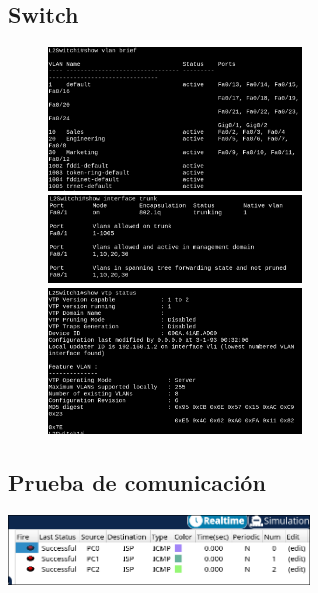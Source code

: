 \documentclass[letterpaper,12pt]{article}
\begin{document}
\begin{sloppypar}
\subsection{Switch}
\begin{figure}[H]
    \centering 
    \includegraphics[width=0.6\textwidth]{s1.png}
    \vspace{0.3cm}\\ 
    \includegraphics[width=0.6\textwidth]{s2.png}
    \vspace{0.3cm}\\ 
    \includegraphics[width=0.6\textwidth]{s3.png}
\end{figure}
\subsection{Prueba de comunicación}
\centering
\includegraphics[width=0.6\textwidth]{pruebitsa.png}






\end{sloppypar}
\end{document}
